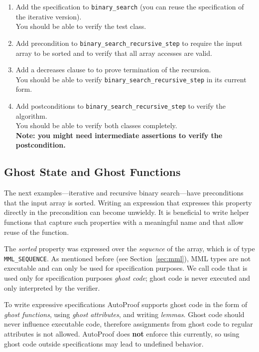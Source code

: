 \documentclass[a4paper,12pt]{article}
\newcommand{\AutoProof}{Auto\-Proof\xspace}
\newcommand{\e}[1]{\mbox{\lstinline[language=Eiffel]|#1|}}
\begin{document}
\begin{enumerate}[label=\bfseries Task \arabic*:, leftmargin=1.8cm]
\item Add the specification to \e{binary_search} (you can reuse the specification of the iterative version). \\
      You should be able to verify the test class.
\item Add precondition to \e{binary_search_recursive_step} to require the input array to be sorted and to verify that all array accesses are valid.
\item Add a decreases clause to to prove termination of the recursion. \\
      You should be able to verify \e{binary_search_recursive_step} in its current form.
\item Add postconditions to \e{binary_search_recursive_step} to verify the algorithm. \\
      You should be able to verify both classes completely. \\
      \textbf{Note: you might need intermediate assertions to verify the postcondition.}
\end{enumerate}


\newpage
\subsection{Ghost State and Ghost Functions} \label{sec:ghost}

The next examples---iterative and recursive binary search---have preconditions that the input array is sorted. Writing an expression that expresses this property directly in the precondition can become unwieldy. It is beneficial to write helper functions that capture such properties with a meaningful name and that allow reuse of the function.

The \emph{sorted} property was expressed over the \emph{sequence} of the array, which is of type \e{MML_SEQUENCE}. As mentioned before (see Section~\ref{sec:mml}), MML types are not executable and can only be used for specification purposes. We call code that is used only for specification purposes \emph{ghost code}; ghost code is never executed and only interpreted by the verifier.

To write expressive specifications \AutoProof supports ghost code in the form of \emph{ghost functions}, using \emph{ghost attributes}, and writing \emph{lemmas}. Ghost code should never influence executable code, therefore assignments from ghost code to regular attributes is not allowed. \AutoProof does \textbf{not} enforce this currently, so using ghost code outside specifications may lead to undefined behavior.
\end{document}
